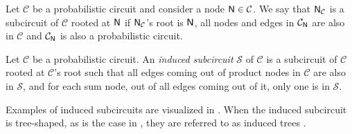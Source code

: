 Let $\mathcal{C}$ be a probabilistic circuit and consider a node $\operatorname{\textup{\textsf{N}}}\in\mathcal{C}$. We say that
$\operatorname{\textup{\textsf{N}}}_\mathcal{C}$ is a subcircuit of $\mathcal{C}$ rooted at $\operatorname{\textup{\textsf{N}}}$ if $\operatorname{\textup{\textsf{N}}}_\mathcal{C}$'s
root is $\operatorname{\textup{\textsf{N}}}$, all nodes and edges in $\mathcal{C}_{\operatorname{\textup{\textsf{N}}}}$ are also in $\mathcal{C}$ and
$\mathcal{C}_{\operatorname{\textup{\textsf{N}}}}$ is also a probabilistic circuit.

\begin{definition}\label{def:inducedsub}
  Let $\mathcal{C}$ be a probabilistic circuit. An \emph{induced subcircuit} $\mathcal{S}$ of
  $\mathcal{C}$ is a subcircuit of $\mathcal{C}$ rooted at $\mathcal{C}$'s root such that all edges
  coming out of product nodes in $\mathcal{C}$ are also in $\mathcal{S}$, and for each sum node,
  out of all edges coming out of it, only one is in $\mathcal{S}$.
\end{definition}

Examples of induced subcircuits are visualized in . When the induced subcircuit
is tree-shaped, as is the case in , they are referred to as induced trees
\citep{zhao15,zhao16b}.

